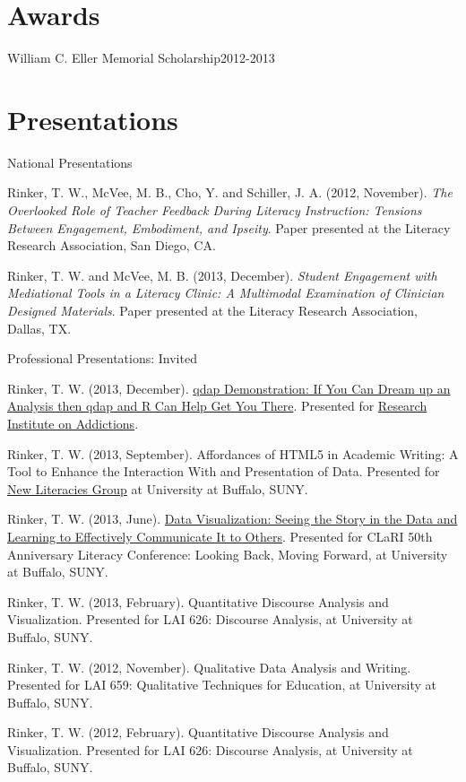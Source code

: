 \section{Awards}
\begin{innerlist}
\item William C. Eller Memorial Scholarship\hfill 2012-2013
\end{innerlist}

\halfblankline

\section{Presentations}
National Presentations
\begin{innerlist}
\item Rinker, T. W., McVee, M. B., Cho, Y. and Schiller, J. A. (2012, November).  \emph{The Overlooked Role of Teacher Feedback During Literacy Instruction: Tensions Between Engagement, Embodiment, and Ipseity}.  Paper presented at the Literacy Research Association, San Diego, CA.

\item Rinker, T. W. and McVee, M. B. (2013, December).  \emph{Student Engagement with Mediational Tools in a Literacy Clinic: A Multimodal Examination of Clinician Designed Materials}.  Paper presented at the Literacy Research Association, Dallas, TX.
\end{innerlist}

\halfblankline

Professional Presentations: Invited
\begin{innerlist}
    \item Rinker, T. W. (2013, December). \href{http://rpubs.com/trinker/11429}{qdap Demonstration: If You Can Dream up an Analysis then qdap and R Can Help Get You There}.  Presented for \href{http://www.buffalo.edu/ria.html}{Research Institute on Addictions}.
    \item Rinker, T. W. (2013, September). Affordances of HTML5 in Academic Writing: A Tool to Enhance the Interaction With and Presentation of Data.  Presented for \href{http://gse.buffalo.edu/org/nlg/}{New Literacies Group} at University at Buffalo, SUNY.
    \item Rinker, T. W. (2013, June). \href{http://www.youtube.com/watch?v=IHHPO4VhucY}{Data Visualization: Seeing the Story in the Data and Learning to Effectively Communicate It to Others}.  Presented for CLaRI 50th Anniversary Literacy Conference: Looking Back, Moving Forward, at University at Buffalo, SUNY.
	\item Rinker, T. W. (2013, February). Quantitative Discourse Analysis and Visualization. Presented for LAI 626: Discourse Analysis, at University at Buffalo, SUNY.
	\item Rinker, T. W. (2012, November). Qualitative Data Analysis and Writing. Presented for LAI 659: Qualitative Techniques for Education, at University at Buffalo, SUNY.
	\item Rinker, T. W. (2012, February). Quantitative Discourse Analysis and Visualization. Presented for LAI 626: Discourse Analysis, at University at Buffalo, SUNY.
\end{innerlist}

